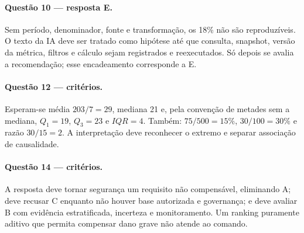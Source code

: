 \paragraph{Questão 10 --- resposta E.} Sem período, denominador, fonte e transformação, os 18\% não são reproduzíveis. O texto da IA deve ser tratado como hipótese até que consulta, snapshot, versão da métrica, filtros e cálculo sejam registrados e reexecutados. Só depois se avalia a recomendação; esse encadeamento corresponde a E.

\paragraph{Questão 12 --- critérios.} Esperam-se média $203/7=29$, mediana 21 e, pela convenção de metades sem a mediana, $Q_1=19$, $Q_3=23$ e $IQR=4$. Também: $75/500=15\%$, $30/100=30\%$ e razão $30/15=2$. A interpretação deve reconhecer o extremo e separar associação de causalidade.

\paragraph{Questão 14 --- critérios.} A resposta deve tornar segurança um requisito não compensável, eliminando A; deve recusar C enquanto não houver base autorizada e governança; e deve avaliar B com evidência estratificada, incerteza e monitoramento. Um ranking puramente aditivo que permita compensar dano grave não atende ao comando.
